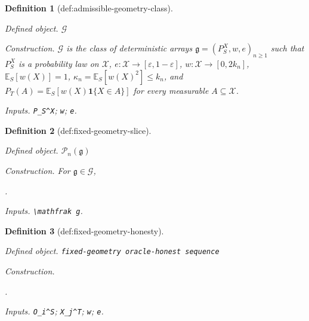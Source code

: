 \documentclass{article}
\newtheorem{definition}{Definition}
\begin{document}
\begin{definition}[def:admissible-geometry-class]\label{def:admissible-geometry-class}
\par\smallskip\noindent\emph{Defined object.} \(\mathcal G\)
\par\smallskip\noindent\emph{Construction.} \(\mathcal G\) is the class of deterministic arrays \(\mathfrak g=(P_S^X,w,e)_{n\ge1}\) such that \(P_S^X\) is a probability law on \(\mathcal X\), \(e:\mathcal X\to[\varepsilon,1-\varepsilon]\), \(w:\mathcal X\to[0,2k_n]\), \(\mathbb E_S[w(X)]=1\), \(\kappa_n=\mathbb E_S[w(X)^2]\le k_n\), and \(P_T(A)=\mathbb E_S[w(X)\mathbf 1\{X\in A\}]\) for every measurable \(A\subseteq\mathcal X\).
\par\smallskip\noindent\emph{Inputs.} \texttt{P\_\allowbreak{}S\textasciicircum{}X}; \texttt{w}; \texttt{e}.
\end{definition}

\begin{definition}[def:fixed-geometry-slice]\label{def:fixed-geometry-slice}
\par\smallskip\noindent\emph{Defined object.} \(\mathcal P_n(\mathfrak g)\)
\par\smallskip\noindent\emph{Construction.} For \(\mathfrak g\in\mathcal G\), \par\noindent {}\par\noindent.
\par\smallskip\noindent\emph{Inputs.} \texttt{\textbackslash{}\allowbreak{}mathfrak g}.
\end{definition}

\begin{definition}[def:fixed-geometry-honesty]\label{def:fixed-geometry-honesty}
\par\smallskip\noindent\emph{Defined object.} \texttt{fixed-\allowbreak{}geometry oracle-\allowbreak{}honest sequence}
\par\smallskip\noindent\emph{Construction.} \par\noindent {}\par\noindent.
\par\smallskip\noindent\emph{Inputs.} \texttt{O\_\allowbreak{}i\textasciicircum{}S}; \texttt{X\_\allowbreak{}j\textasciicircum{}T}; \texttt{w}; \texttt{e}.
\end{definition}
\end{document}
